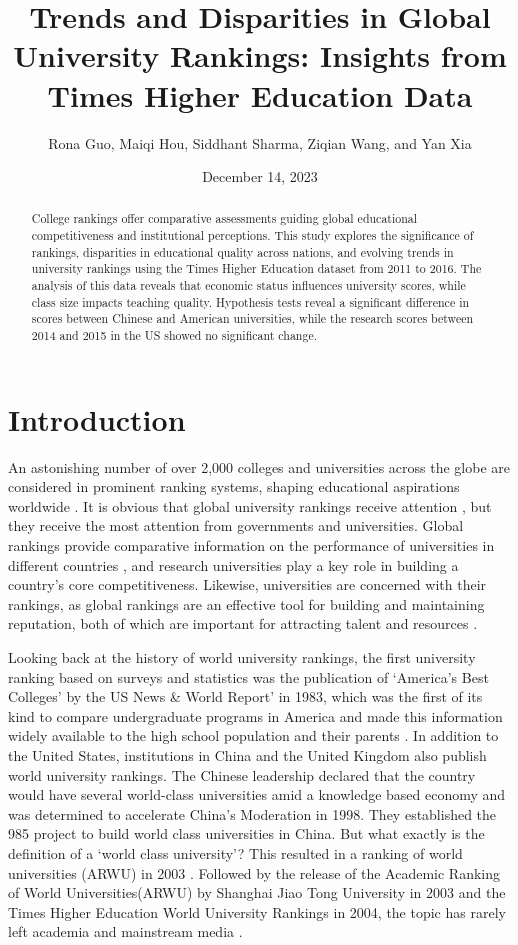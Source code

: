 \documentclass[a4paper]{article}
\title{Trends and Disparities in Global University Rankings: Insights from Times Higher Education Data}
\author{Rona Guo, Maiqi Hou, Siddhant Sharma, Ziqian Wang, and Yan Xia}
\affil{University of Colorado Boulder}
\affil{STAT 5000: Statistical Methods and Applications I}
\date{December 14, 2023}
\begin{document}
\maketitle

\begin{abstract}
College rankings offer comparative assessments guiding global educational competitiveness and institutional perceptions. This study explores the significance of rankings, disparities in educational quality across nations, and evolving trends in university rankings using the Times Higher Education dataset from 2011 to 2016. The analysis of this data reveals that economic status influences university scores, while class size impacts teaching quality. Hypothesis tests reveal a significant difference in scores between Chinese and American universities, while the research scores between 2014 and 2015 in the US showed no significant change.
\end{abstract}

\section*{Introduction}
An astonishing number of over 2,000 colleges and universities across the globe are considered in prominent ranking systems, shaping educational aspirations worldwide \cite{marope_rankings_2013}. It is obvious that global university rankings receive attention \cite{sanoff_ussher_massimo_clarke_2007}, but they receive the most attention from governments and universities. Global rankings provide comparative information on the performance of universities in different countries \cite{marope_rankings_2013}, and research universities play a key role in building a country's core competitiveness\cite{hazelkorn_2013}. Likewise, universities are concerned with their rankings, as global rankings are an effective tool for building and maintaining reputation, both of which are important for attracting talent and resources \cite{marope_rankings_2013}.

Looking back at the history of world university rankings, the first university ranking based on surveys and statistics was the publication of ‘America’s Best Colleges’ by the US News \& World Report’ in 1983, which was the first of its kind to compare undergraduate programs in America and made this information widely available to the high school population and their parents \cite{marope_rankings_2013}. In addition to the United States, institutions in China and the United Kingdom also publish world university rankings. The Chinese leadership declared that the country would have several world-class universities amid a knowledge based economy and was determined to accelerate China’s Moderation in 1998. They established the 985 project to build world class universities in China. But what exactly is the definition of a ‘world class university’? This resulted in a ranking of world universities (ARWU) in 2003 \cite{marope_rankings_2013}.  Followed by the release of the Academic Ranking of World Universities(ARWU) by Shanghai Jiao Tong University in 2003 and the Times Higher Education World University Rankings in 2004, the topic has rarely left academia and mainstream media \cite{marope_rankings_2013}.
\end{document}
